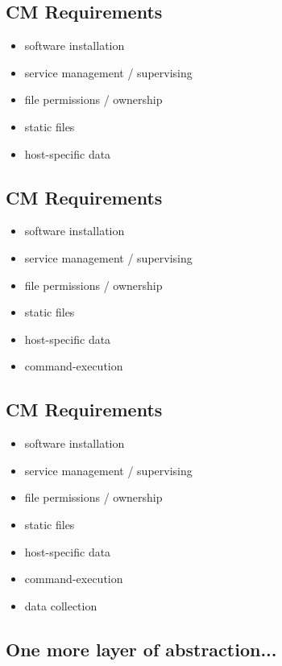 \documentclass[xga]{xdvislides}
\begin{document}
\subsection{CM Requirements}
\begin{itemize}
	\item software installation
	\item service management / supervising
	\item file permissions / ownership
	\item static files
	\item host-specific data
\end{itemize}

\subsection{CM Requirements}
\begin{itemize}
	\item software installation
	\item service management / supervising
	\item file permissions / ownership
	\item static files
	\item host-specific data
\end{itemize}
\vspace{.25in}
\begin{itemize}
	\item command-execution
\end{itemize}

\subsection{CM Requirements}
\begin{itemize}
	\item software installation
	\item service management / supervising
	\item file permissions / ownership
	\item static files
	\item host-specific data
\end{itemize}
\vspace{.25in}
\begin{itemize}
	\item command-execution
	\item data collection
\end{itemize}

\subsection{One more layer of abstraction...}
\vspace{.5in}
\end{document}
